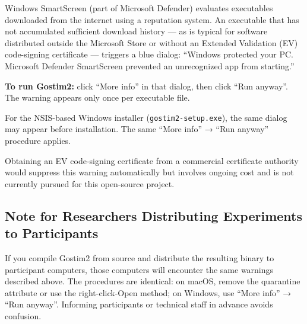 \documentclass[
  11pt,
]{article}
\begin{document}
Windows SmartScreen (part of Microsoft Defender) evaluates executables
downloaded from the internet using a reputation system. An executable
that has not accumulated sufficient download history --- as is typical
for software distributed outside the Microsoft Store or without an
Extended Validation (EV) code-signing certificate --- triggers a blue
dialog: ``Windows protected your PC. Microsoft Defender SmartScreen
prevented an unrecognized app from starting.''

\textbf{To run Gostim2:} click ``More info'' in that dialog, then click
``Run anyway''. The warning appears only once per executable file.

For the NSIS-based Windows installer (\texttt{gostim2-setup.exe}), the
same dialog may appear before installation. The same ``More info'' →
``Run anyway'' procedure applies.

Obtaining an EV code-signing certificate from a commercial certificate
authority would suppress this warning automatically but involves ongoing
cost and is not currently pursued for this open-source project.

\subsection{Note for Researchers Distributing Experiments to
Participants}\label{note-for-researchers-distributing-experiments-to-participants}

If you compile Gostim2 from source and distribute the resulting binary
to participant computers, those computers will encounter the same
warnings described above. The procedures are identical: on macOS, remove
the quarantine attribute or use the right-click-Open method; on Windows,
use ``More info'' → ``Run anyway''. Informing participants or technical
staff in advance avoids confusion.
\end{document}
